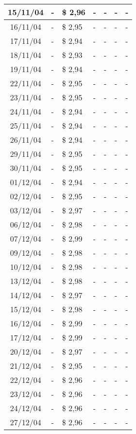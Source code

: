 \begin{center}
\begin{longtable}{|c|p{1.5cm}|p{1.5cm}|p{1.5cm}|p{1.5cm}|p{1.5cm}|p{1.5cm}|}
15/11/04 & - & \$ 2,96 & - & - & - & - \\ \hline
16/11/04 & - & \$ 2,95 & - & - & - & - \\ \hline
17/11/04 & - & \$ 2,94 & - & - & - & - \\ \hline
18/11/04 & - & \$ 2,93 & - & - & - & - \\ \hline
19/11/04 & - & \$ 2,94 & - & - & - & - \\ \hline
22/11/04 & - & \$ 2,95 & - & - & - & - \\ \hline
23/11/04 & - & \$ 2,95 & - & - & - & - \\ \hline
24/11/04 & - & \$ 2,94 & - & - & - & - \\ \hline
25/11/04 & - & \$ 2,94 & - & - & - & - \\ \hline
26/11/04 & - & \$ 2,94 & - & - & - & - \\ \hline
29/11/04 & - & \$ 2,95 & - & - & - & - \\ \hline
30/11/04 & - & \$ 2,95 & - & - & - & - \\ \hline
01/12/04 & - & \$ 2,94 & - & - & - & - \\ \hline
02/12/04 & - & \$ 2,95 & - & - & - & - \\ \hline
03/12/04 & - & \$ 2,97 & - & - & - & - \\ \hline
06/12/04 & - & \$ 2,98 & - & - & - & - \\ \hline
07/12/04 & - & \$ 2,99 & - & - & - & - \\ \hline
09/12/04 & - & \$ 2,98 & - & - & - & - \\ \hline
10/12/04 & - & \$ 2,98 & - & - & - & - \\ \hline
13/12/04 & - & \$ 2,98 & - & - & - & - \\ \hline
14/12/04 & - & \$ 2,97 & - & - & - & - \\ \hline
15/12/04 & - & \$ 2,98 & - & - & - & - \\ \hline
16/12/04 & - & \$ 2,99 & - & - & - & - \\ \hline
17/12/04 & - & \$ 2,99 & - & - & - & - \\ \hline
20/12/04 & - & \$ 2,97 & - & - & - & - \\ \hline
21/12/04 & - & \$ 2,95 & - & - & - & - \\ \hline
22/12/04 & - & \$ 2,96 & - & - & - & - \\ \hline
23/12/04 & - & \$ 2,96 & - & - & - & - \\ \hline
24/12/04 & - & \$ 2,96 & - & - & - & - \\ \hline
27/12/04 & - & \$ 2,96 & - & - & - & - \\ \hline

\end{longtable}
\end{center}

